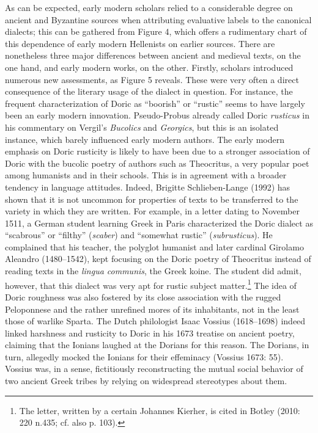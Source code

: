 \begin{styleStandard}
As can be expected, early modern scholars relied to a considerable degree on ancient and Byzantine sources when attributing evaluative labels to the canonical dialects; this can be gathered from Figure 4, which offers a rudimentary chart of this dependence of early modern Hellenists on earlier sources. There are nonetheless three major differences between ancient and medieval texts, on the one hand, and early modern works, on the other. Firstly, scholars introduced numerous new assessments, as Figure 5 reveals. These were very often a direct consequence of the literary usage of the dialect in question. For instance, the frequent characterization of Doric as “boorish” or “rustic” seems to have largely been an early modern innovation. Pseudo-Probus already called Doric \textit{rusticus} in his commentary on Vergil’s \textit{Bucolics} and \textit{Georgics}, but this is an isolated instance, which barely influenced early modern authors. The early modern emphasis on Doric rusticity is likely to have been due to a stronger association of Doric with the bucolic poetry of authors such as Theocritus, a very popular poet among humanists and in their schools. This is in agreement with a broader tendency in language attitudes. Indeed, Brigitte Schlieben-Lange (1992) has shown that it is not uncommon for properties of texts to be transferred to the variety in which they are written. For example, in a letter dating to November 1511, a German student learning Greek in Paris characterized the Doric dialect as “scabrous” or “filthy” (\textit{scaber}) and “somewhat rustic” (\textit{subrusticus}). He complained that his teacher, the polyglot humanist and later cardinal Girolamo Aleandro (1480–1542), kept focusing on the Doric poetry of Theocritus instead of reading texts in the \textit{lingua communis}, the Greek koine. The student did admit, however, that this dialect was very apt for rustic subject matter.\footnote{ The letter, written by a certain Johannes Kierher, is cited in Botley (2010: 220 n.435; cf. also p. 103).} The idea of Doric roughness was also fostered by its close association with the rugged Peloponnese and the rather unrefined mores of its inhabitants, not in the least those of warlike Sparta. The Dutch philologist Isaac Vossius (1618–1698) indeed linked harshness and rusticity to Doric in his 1673 treatise on ancient poetry, claiming that the Ionians laughed at the Dorians for this reason. The Dorians, in turn, allegedly mocked the Ionians for their effeminacy (Vossius 1673: 55). Vossius was, in a sense, fictitiously reconstructing the mutual social behavior of two ancient Greek tribes by relying on widespread stereotypes about them.
\end{styleStandard}

